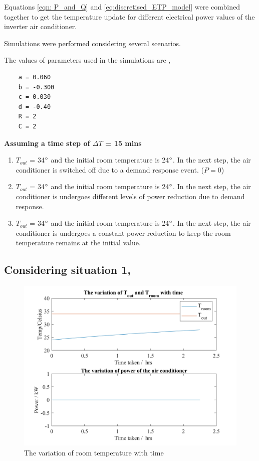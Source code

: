 \documentclass[12pt,a4paper]{article}
\begin{document}
\begin{itemize}
Equations \eqref{eqn: P_and_Q} and \eqref{eq:discretised_ETP_model} were combined together to get the temperature update for different electrical power values of the inverter air conditioner.

\pagebreak

Simulations were performed considering several scenarios.

The values of parameters used in the simulations are \cite{7890446},
\begin{verbatim}
    a = 0.060 
    b = -0.300 
    c = 0.030 
    d = -0.40 
    R = 2 
    C = 2
\end{verbatim}



\textbf{Assuming a time step of $\Delta T$ = 15 mins}

\begin{enumerate}
    \item $T_{out}$ = 34$\degree$ and the initial room temperature is 24$\degree$. In the next step, the air conditioner is switched off due to a demand response event. ($P=0$) 
    
    \item $T_{out}$ = 34$\degree$ and the initial room temperature is 24$\degree$. In the next step, the air conditioner is undergoes different levels of power reduction due to demand response.
    
    \item $T_{out}$ = 34$\degree$ and the initial room temperature is 24$\degree$. In the next step, the air conditioner is undergoes a constant power reduction to keep the room temperature remains at the initial value.
    
\end{enumerate}

\subsection*{Considering situation 1,}

\begin{figure}[htb]
    \centering
    \includegraphics[width=13cm]{images/power_at_zero.jpg}
    \caption{The variation of room temperature with time}
    \label{fig:zeropower}
\end{figure}


\end{itemize}
\end{document}
